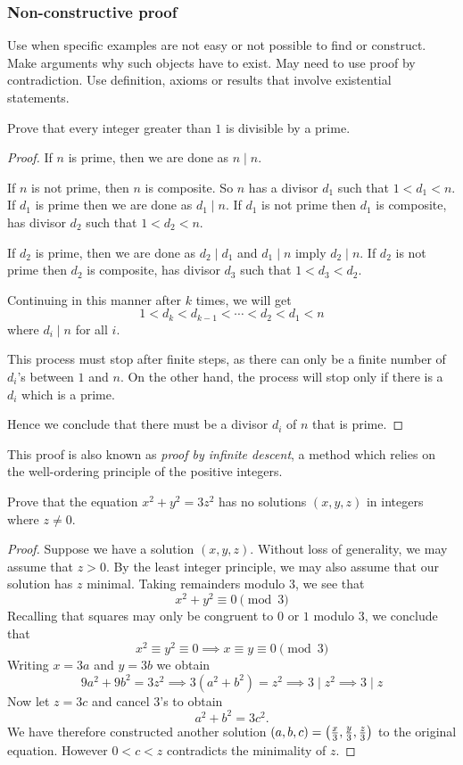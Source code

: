 \subsubsection{Non-constructive proof}
Use when specific examples are not easy or not possible to find or construct.
Make arguments why such objects have to exist.
May need to use proof by contradiction.
Use definition, axioms or results that involve existential statements.

\begin{exercise}{}{}
Prove that every integer greater than $1$ is divisible by a prime.
\end{exercise}

\begin{proof}
If $n$ is prime, then we are done as $n\mid n$.

If $n$ is not prime, then $n$ is composite. So $n$ has a divisor $d_1$ such that $1<d_1<n$. If $d_1$ is prime then we are done as $d_1\mid n$. If $d_1$ is not prime then $d_1$ is composite, has divisor $d_2$ such that $1<d_2<n$.

If $d_2$ is prime, then we are done as $d_2\mid d_1$ and $d_1\mid n$ imply $d_2\mid n$. If $d_2$ is not prime then $d_2$ is composite, has divisor $d_3$ such that $1<d_3<d_2$.

Continuing in this manner after $k$ times, we will get
\[ 1<d_k<d_{k-1}<\cdots<d_2<d_1<n \]
where $d_i\mid n$ for all $i$.

This process must stop after finite steps, as there can only be a finite number of $d_i$'s between $1$ and $n$. On the other hand, the process will stop only if there is a $d_i$ which is a prime. 

Hence we conclude that there must be a divisor $d_i$ of $n$ that is prime.
\end{proof}

\begin{remark}
This proof is also known as \emph{proof by infinite descent}, a method which relies on the well-ordering principle of the positive integers.
\end{remark}

\begin{exercise}{}{}
Prove that the equation $x^2+y^2=3z^2$ has no solutions $(x,y,z)$ in integers where $z\neq0$.
\end{exercise}

\begin{proof}
Suppose we have a solution $(x,y,z)$. Without loss of generality, we may assume that $z>0$. By the least integer principle, we may also assume that our solution has $z$ minimal. Taking remainders modulo $3$, we see that
\[ x^2+y^2\equiv0\pmod3 \]
Recalling that squares may only be congruent to $0$ or $1$ modulo $3$, we conclude that
\[ x^2\equiv y^2\equiv 0 \implies x \equiv y \equiv 0 \pmod 3 \]
Writing $x=3a$ and $y=3b$ we obtain
\[ 9a^2+9b^2=3z^2 \implies 3(a^2+b^2)=z^2 \implies 3\mid z^2 \implies 3\mid z \]
Now let $z=3c$ and cancel $3$'s to obtain
\[ a^2+b^2=3c^2. \]
We have therefore constructed another solution $(a,b,c)=\left(\frac{x}{3},\frac{y}{3},\frac{z}{3}\right)$ to the original equation. However $0<c<z$ contradicts the minimality of $z$.
\end{proof}


